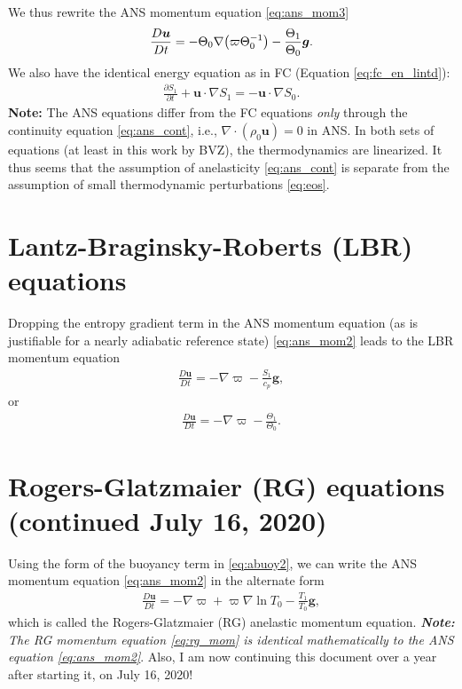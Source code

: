 \documentclass[12pt]{article} %
\newcommand{\pderiv}[2]{\frac{\partial#1}{\partial#2}}
\newcommand{\pomega}{\varpi}
\newcommand{\ugrad}{\bm{u}\cdot\nabla}
\begin{document}
	We thus rewrite the ANS momentum equation \eqref{eq:ans_mom3}
	\begin{align}
	\frac{D\bm{u}}{Dt}=-\Theta_0\nabla\big{(}\pomega\Theta_0^{-1}\big{)}-\frac{\Theta_1}{\Theta_0}\bm{g}.
	\end{align}
	We also have the identical energy equation as in FC (Equation \eqref{eq:fc_en_lintd}):
	\begin{align}
	\pderiv{S_1}{t} + \ugrad S_1  = - \ugrad S_0.
	\end{align}
	\textbf{Note:} The ANS equations differ from the FC equations \textit{only} through the continuity equation \eqref{eq:ans_cont}, i.e., $\nabla\cdot(\rho_0\bm{u})=0$ in ANS. In both sets of equations (at least in this work by BVZ), the thermodynamics are linearized. It thus seems that the assumption of anelasticity \eqref{eq:ans_cont} is separate from the assumption of small thermodynamic perturbations \eqref{eq:eos}. 
	
	\section{Lantz-Braginsky-Roberts (LBR) equations}
	Dropping the entropy gradient term in the ANS momentum equation (as is justifiable for a nearly adiabatic reference state) \eqref{eq:ans_mom2} leads to the LBR momentum equation
	\begin{align}
		\frac{D\bm{u}}{Dt} = -\nabla\pomega - \frac{S_1}{c_p}\bm{g},
		\label{eq:lbr_mom}
	\end{align}
	or
	\begin{align}
	\frac{D\bm{u}}{Dt} = -\nabla\pomega - \frac{\Theta_1}{\Theta_0}. 
		\label{eq:lbr_mom2}	
	\end{align}
	
	\section{Rogers-Glatzmaier (RG) equations (continued July 16, 2020)}
	Using the form of the buoyancy term in \eqref{eq:abuoy2}, we can write the ANS momentum equation \eqref{eq:ans_mom2} in the alternate form
	\begin{align}
	\frac{D\bm{u}}{Dt} = -\nabla\pomega +\pomega\nabla\ln T_0 - \frac{T_1}{T_0}\bm{g},
	\label{eq:rg_mom}
	\end{align} 
	which is called the Rogers-Glatzmaier (RG) anelastic momentum equation. \textit{\textbf{Note:} The RG momentum equation \eqref{eq:rg_mom} is identical mathematically to the ANS equation \eqref{eq:ans_mom2}}. Also, I am now continuing this document over a year after starting it, on July 16, 2020!
	
\end{document}

